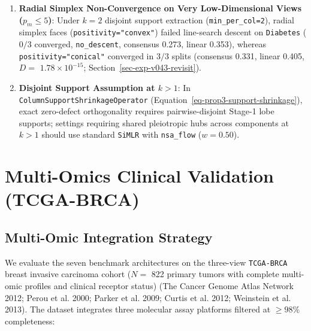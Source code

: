 \documentclass[
  10pt,
  letterpaper,
]{report}
\begin{document}
\begin{enumerate}
  \textbf{Polarity User Contract and Mixed-Sign Cancellation}:
  \texttt{fit\_uniform\_shrunk} requires caller-aligned feature signs
  (for example via \texttt{prepare\_views}); unaligned opposing signs
  cancel under the within-support mean projector \(\Pi_m\), and
  non-negative constraints suppress negative loadings
  (Section~\ref{sec-uniform-shrinkage}).
\item
  \textbf{Radial Simplex Non-Convergence on Very Low-Dimensional Views
  (\(p_m \le 5\))}: Under \(k = 2\) disjoint support extraction
  (\texttt{min\_per\_col=2}), radial simplex faces
  (\texttt{positivity="convex"}) failed line-search descent on
  \texttt{Diabetes} (\(0/3\) converged, \texttt{no\_descent}, consensus
  0.273, linear 0.353), whereas \texttt{positivity="conical"} converged
  in \(3/3\) splits (consensus 0.331, linear 0.405, \(D =\)
  \(1.78 \times 10^{-15}\); Section~\ref{sec-exp-v043-revisit}).
\item
  \textbf{Disjoint Support Assumption at \(k > 1\)}: In
  \texttt{ColumnSupportShrinkageOperator}
  (Equation~\ref{eq-prop3-support-shrinkage}), exact zero-defect
  orthogonality requires pairwise-disjoint Stage-1 lobe supports;
  settings requiring shared pleiotropic hubs across components at
  \(k > 1\) should use standard \texttt{SiMLR} with \texttt{nsa\_flow}
  (\(w = 0.50\)).
\end{enumerate}

\cleardoublepage
{}
{}
\appendix

\chapter{Multi-Omics Clinical Validation
(TCGA-BRCA)}\label{sec-app-brca}

\section{Multi-Omic Integration
Strategy}\label{multi-omic-integration-strategy}

We evaluate the seven benchmark architectures on the three-view
\texttt{TCGA-BRCA} breast invasive carcinoma cohort (\(N =\) 822 primary
tumors with complete multi-omic profiles and clinical receptor status)
(The Cancer Genome Atlas Network 2012; {Perou et al.} 2000; {Parker et
al.} 2009; {Curtis et al.} 2012; Weinstein et al. 2013). The dataset
integrates three molecular assay platforms filtered at \(\ge 98\%\)
completeness:
\end{document}
